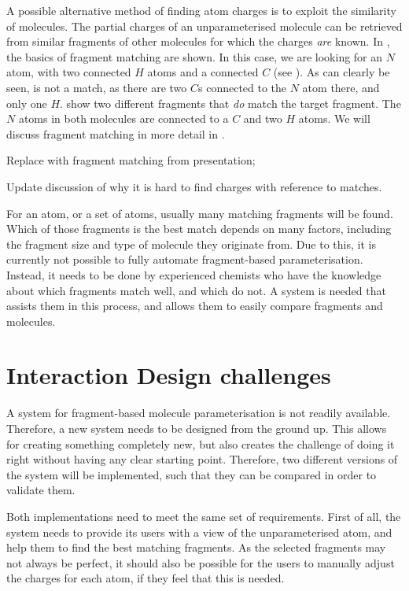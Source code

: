 A possible alternative method of finding atom charges is to exploit the similarity of molecules. The partial charges of an unparameterised molecule can be retrieved from similar fragments of other molecules for which the charges \emph{are} known. In , the basics of fragment matching are shown. In this case, we are looking for an $N$ atom, with two connected $H$ atoms and a connected $C$ (see ). As can clearly be seen,  is not a match, as there are two $C$s connected to the $N$ atom there, and only one $H$.  show two different fragments that \emph{do} match the target fragment. The $N$ atoms in both molecules are connected to a $C$ and two $H$ atoms. We will discuss fragment matching in more detail in .

\begin{todo}
\item Replace with fragment matching from presentation;
\item Update discussion of why it is hard to find charges with reference to matches.
\end{todo}

For an atom, or a set of atoms, usually many matching fragments will be found. Which of those fragments is the best match depends on many factors, including the fragment size and type of molecule they originate from. Due to this, it is currently not possible to fully automate fragment-based parameterisation. Instead, it needs to be done by experienced chemists who have the knowledge about which fragments match well, and which do not. A system is needed that assists them in this process, and allows them to easily compare fragments and molecules.



\section{Interaction Design challenges}
A system for fragment-based molecule parameterisation is not readily available. Therefore, a new system needs to be designed from the ground up. This allows for creating something completely new, but also creates the challenge of doing it right without having any clear starting point. Therefore, two different versions of the system will be implemented, such that they can be compared in order to validate them.

Both implementations need to meet the same set of requirements. First of all, the system needs to provide its users with a view of the unparameterised atom, and help them to find the best matching fragments. As the selected fragments may not always be perfect, it should also be possible for the users to manually adjust the charges for each atom, if they feel that this is needed.

